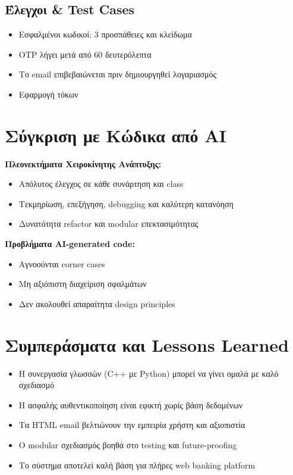 \documentclass[a4paper,12pt]{article}
\begin{document}
\subsection*{Έλεγχοι \& Test Cases}
\begin{itemize}[label=\textbullet]
    \item Εσφαλμένοι κωδικοί: 3 προσπάθειες και κλείδωμα
    \item OTP λήγει μετά από 60 δευτερόλεπτα
    \item Το email επιβεβαιώνεται πριν δημιουργηθεί λογαριασμός
    \item Εφαρμογή τόκων
\end{itemize}

\section{Σύγκριση με Κώδικα από AI}
\textbf{Πλεονεκτήματα Χειροκίνητης Ανάπτυξης:}
\begin{itemize}[label=\textbullet]
    \item Απόλυτος έλεγχος σε κάθε συνάρτηση και class
    \item Τεκμηρίωση, επεξήγηση, debugging και καλύτερη κατανόηση
    \item Δυνατότητα refactor και modular επεκτασιμότητας
\end{itemize}

\textbf{Προβλήματα AI-generated code:}
\begin{itemize}[label=\textbullet]
    \item Αγνοούνται corner cases
    \item Μη αξιόπιστη διαχείριση σφαλμάτων
    \item Δεν ακολουθεί απαραίτητα design principles
\end{itemize}

\section{Συμπεράσματα και Lessons Learned}
\begin{itemize}[label=\textbullet]
    \item Η συνεργασία γλωσσών (C++ με Python) μπορεί να γίνει ομαλά με καλό σχεδιασμό
    \item Η ασφαλής αυθεντικοποίηση είναι εφικτή χωρίς βάση δεδομένων
    \item Τα HTML email βελτιώνουν την εμπειρία χρήστη και αξιοπιστία
    \item Ο modular σχεδιασμός βοηθά στο testing και future-proofing
    \item Το σύστημα αποτελεί καλή βάση για πλήρες web banking platform
\end{itemize}
\end{document}
